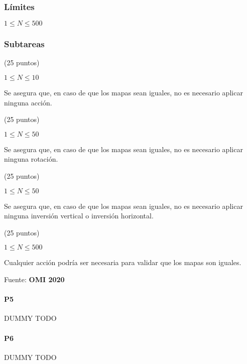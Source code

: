 \subsubsection*{Límites}
\(1 \leq N \leq 500\)
\subsubsection*{Subtareas}
\begin{plimits}
	\item (25 puntos)
	\begin{plimits}
		\item \(1\leq N \leq 10\)
		\item Se asegura que, en caso de que los mapas sean iguales, no es necesario aplicar ninguna acción.
	\end{plimits}
	\item (25 puntos)
	\begin{plimits}
		\item \(1\leq N \leq 50\)
		\item Se asegura que, en caso de que los mapas sean iguales, no es necesario aplicar ninguna rotación.
	\end{plimits}
	\item (25 puntos)
	\begin{plimits}
		\item \(1\leq N \leq 50\)
		\item Se asegura que, en caso de que los mapas sean iguales, no es necesario aplicar ninguna inversión vertical o inversión horizontal.
	\end{plimits}
	\item (25 puntos)
	\begin{plimits}
		\item \(1\leq N \leq 500\)
		\item Cualquier acción podría ser necesaria para validar que los mapas son iguales.
	\end{plimits}
\end{plimits}
 Fuente: \textbf{OMI 2020}
 
 
 
 \problembreak
 
 \paragraph{P5} DUMMY TODO
 
 
 \problembreak
 
 \paragraph{P6} DUMMY TODO


